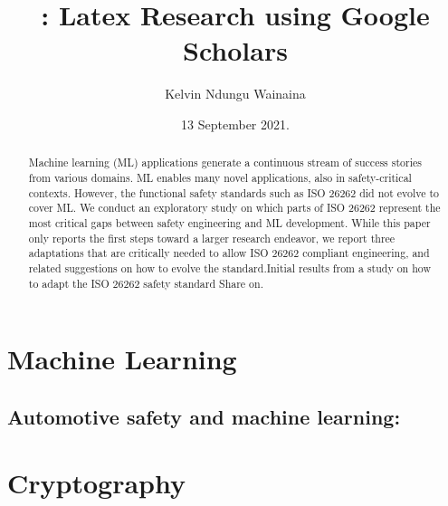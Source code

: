 \documentclass[a4paper]{article}
\title{: Latex Research using Google Scholars}
\author{Kelvin Ndungu Wainaina}
\date{13 September 2021.}
\begin{document}
\maketitle

\section{Machine Learning}
\subsection{Automotive safety and machine learning:}
\begin{abstract}

Machine learning (ML) applications generate a continuous stream of success stories from various domains. ML enables many novel applications, also in safety-critical contexts. However, the functional safety standards such as ISO 26262 did not evolve to cover ML. We conduct an exploratory study on which parts of ISO 26262 represent the most critical gaps between safety engineering and ML development. While this paper only reports the first steps toward a larger research endeavor, we report three adaptations that are critically needed to allow ISO 26262 compliant engineering, and related suggestions on how to evolve the standard.Initial results from a study on how to adapt the ISO 26262 safety standard
Share on.
\end{abstract}

\section{Cryptography}
\end{document}
